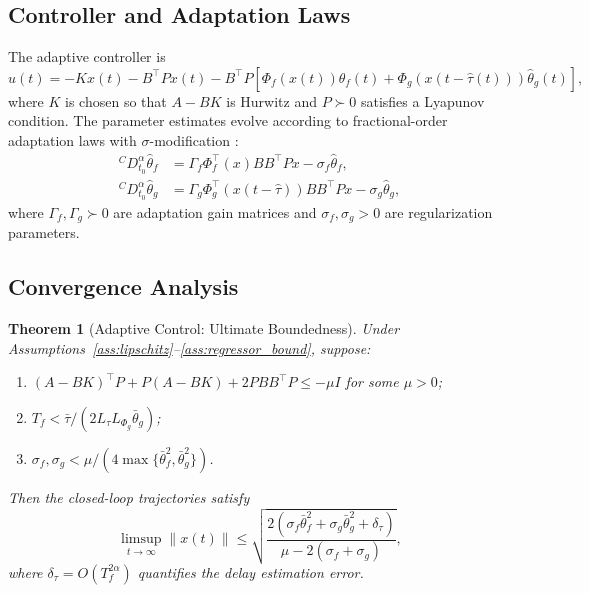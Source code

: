 \documentclass[12pt,a4paper]{article}
\newtheorem{theorem}{Theorem}
\begin{document}
\subsection{Controller and Adaptation Laws}

The adaptive controller is
\begin{equation}
\label{eq:controller}
u(t) = -K x(t) - B^{\!\top}\! P x(t) - B^{\!\top}\! P \left[ \Phi_f(x(t)) \hat{\theta}_f(t) + \Phi_g(x(t-\hat{\tau}(t))) \hat{\theta}_g(t) \right],
\end{equation}
where $K$ is chosen so that $A - BK$ is Hurwitz and $P \succ 0$ satisfies a Lyapunov condition. The parameter estimates evolve according to fractional-order adaptation laws with $\sigma$-modification \cite{ioannou1996}:
\begin{align}
    {}^{C}\!D^{\alpha}_{t_0} \hat{\theta}_f &= \Gamma_f \Phi_f^{\!\top}(x) B B^{\!\top}\! P x - \sigma_f \hat{\theta}_f, \label{eq:adapt_f} \\
    {}^{C}\!D^{\alpha}_{t_0} \hat{\theta}_g &= \Gamma_g \Phi_g^{\!\top}(x(t-\hat{\tau})) B B^{\!\top}\! P x - \sigma_g \hat{\theta}_g, \label{eq:adapt_g}
\end{align}
where $\Gamma_f, \Gamma_g \succ 0$ are adaptation gain matrices and $\sigma_f, \sigma_g > 0$ are regularization parameters.

\subsection{Convergence Analysis}

\begin{theorem}[Adaptive Control: Ultimate Boundedness]
\label{thm:adaptive_stability}
Under Assumptions~\ref{ass:lipschitz}--\ref{ass:regressor_bound}, suppose:
\begin{enumerate}[label=\textup{(C\arabic*)}, leftmargin=2.5em]
\item $(A - BK)^{\!\top}\! P + P(A - BK) + 2PBB^{\!\top}\! P \leq -\mu I$ for some $\mu > 0$;
\item $T_f < \bar{\tau}/(2 L_{\tau} L_{\Phi_g} \bar{\theta}_g)$;
\item $\sigma_f, \sigma_g < \mu / (4 \max\{\bar{\theta}_f^2, \bar{\theta}_g^2\})$.
\end{enumerate}
Then the closed-loop trajectories satisfy
\begin{equation}
\label{eq:ultimate_bound}
\limsup_{t \to \infty} \|x(t)\| \leq \sqrt{\frac{2(\sigma_f \bar{\theta}_f^2 + \sigma_g \bar{\theta}_g^2 + \delta_{\tau})}{\mu - 2(\sigma_f + \sigma_g)}},
\end{equation}
where $\delta_{\tau} = O(T_f^{2\alpha})$ quantifies the delay estimation error.
\end{theorem}
\end{document}
